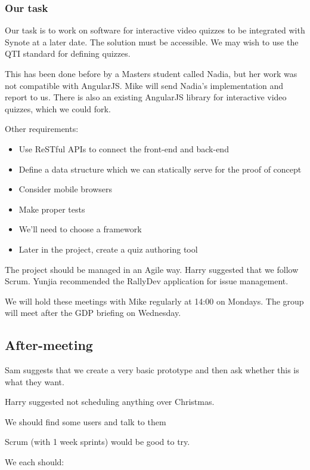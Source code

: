\subsubsection{Our task}

Our task is to work on software for interactive video quizzes to be
integrated with Synote at a later date. The solution must be accessible.
We may wish to use the \gls{QTI} standard for defining quizzes.

This has been done before by a Masters student called Nadia, but her
work was not compatible with AngularJS. Mike will send Nadia's
implementation and report to us. There is also an existing AngularJS
library for interactive video quizzes, which we could fork.

Other requirements:

\begin{itemize}
\itemsep1pt\parskip0pt
\item
  Use ReSTful \glspl{API} to connect the front-end and back-end
\item
  Define a data structure which we can statically serve for the proof of
  concept
\item
  Consider mobile browsers
\item
  Make proper tests
\item
  We'll need to choose a framework
\item
  Later in the project, create a quiz authoring tool
\end{itemize}

The project should be managed in an Agile way. Harry suggested that we
follow Scrum. Yunjia recommended the RallyDev application for issue
management.

We will hold these meetings with Mike regularly at 14:00 on Mondays. The
group will meet after the GDP briefing on Wednesday.

\subsection{After-meeting}

Sam suggests that we create a very basic prototype and then ask whether
this is what they want.

Harry suggested not scheduling anything over Christmas.

We should find some users and talk to them

Scrum (with 1 week sprints) would be good to try.

We each should:

